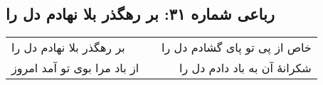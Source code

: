 \begin{center}
\section*{رباعی شماره ۳۱: بر رهگذر بلا نهادم دل را}
\label{sec:0031}
\begin{longtable}{l p{0.5cm} r}
بر رهگذر بلا نهادم دل را
&&
خاص از پی تو پای گشادم دل را
\\
از باد مرا بوی تو آمد امروز
&&
شکرانهٔ آن به باد دادم دل را
\\
\end{longtable}
\end{center}

